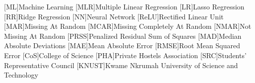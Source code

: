 \begin{acronym}

	[ML]{Machine Learning}
	[MLR]{Multiple Linear Regression}
	[LR]{Lasso Regression}
	[RR]{Ridge Regression}
	[NN]{Neural Network}
	[ReLU]{Rectified Linear Unit}
	[MAR]{Missing At Random}
	[MCAR]{Missing Completely At Random}
	[NMAR]{Not Missing At Random}
	[PRSS]{Penalized Residual Sum of Squares}
	[MAD]{Median Absolute Deviations}
	[MAE]{Mean Absolute Error}
	[RMSE]{Root Mean Squared Error}
	[CoS]{College of Science}
	[PHA]{Private Hostels Association}
	[SRC]{Students' Representative Council}
	[KNUST]{Kwame Nkrumah University of Science and Technology}
		
\end{acronym}
